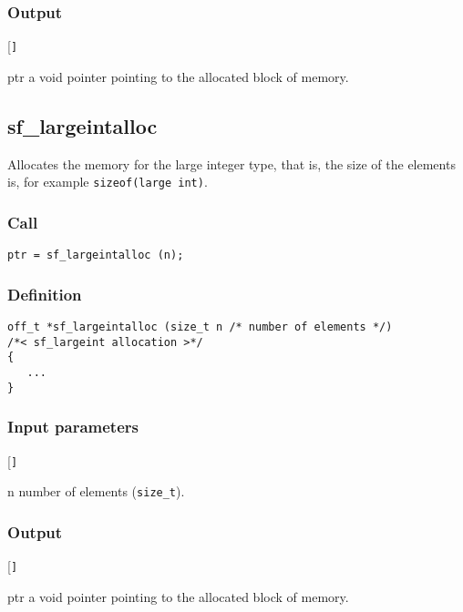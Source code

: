 \subsubsection*{Output}
\begin{desclist}{\tt }{\quad}[\tt ]
   \setlength\itemsep{0pt}
   \item[ptr] a void pointer pointing to the allocated block of memory.
\end{desclist}





\subsection{{sf\_largeintalloc}}
Allocates the memory for  the large integer type, that is,  the size of the elements is, for example \texttt{sizeof(large int)}. 

\subsubsection*{Call}
\begin{verbatim}ptr = sf_largeintalloc (n);\end{verbatim}

\subsubsection*{Definition}
\begin{verbatim}
off_t *sf_largeintalloc (size_t n /* number of elements */)
/*< sf_largeint allocation >*/  
{
   ...
}
\end{verbatim}

\subsubsection*{Input parameters}
\begin{desclist}{\tt }{\quad}[\tt ]
   \setlength\itemsep{0pt}
   \item[n]  number of elements (\texttt{size\_t}).
\end{desclist}

\subsubsection*{Output}
\begin{desclist}{\tt }{\quad}[\tt ]
   \setlength\itemsep{0pt}
   \item[ptr] a void pointer pointing to the allocated block of memory.
\end{desclist}




